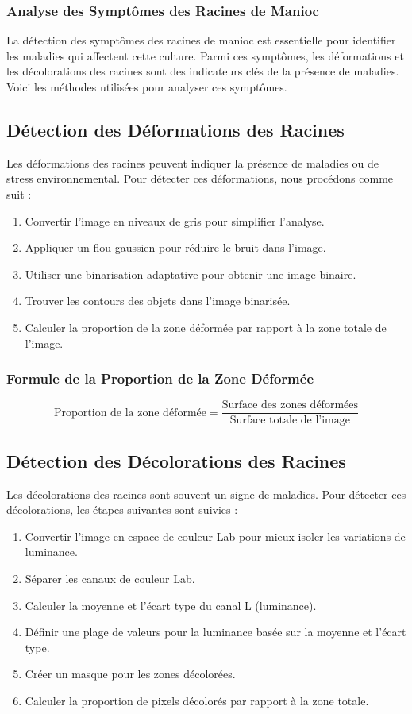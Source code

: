 \subsubsection{Analyse des Symptômes des Racines de Manioc}

La détection des symptômes des racines de manioc est essentielle pour identifier les maladies qui affectent cette culture. Parmi ces symptômes, les déformations et les décolorations des racines sont des indicateurs clés de la présence de maladies. Voici les méthodes utilisées pour analyser ces symptômes.

\subsection*{Détection des Déformations des Racines}

Les déformations des racines peuvent indiquer la présence de maladies ou de stress environnemental. Pour détecter ces déformations, nous procédons comme suit :
\begin{enumerate}
	\item Convertir l'image en niveaux de gris pour simplifier l'analyse.
	\item Appliquer un flou gaussien pour réduire le bruit dans l'image.
	\item Utiliser une binarisation adaptative pour obtenir une image binaire.
	\item Trouver les contours des objets dans l'image binarisée.
	\item Calculer la proportion de la zone déformée par rapport à la zone totale de l'image.
\end{enumerate}

\subsubsection*{Formule de la Proportion de la Zone Déformée}
\[
\text{Proportion de la zone déformée} = \frac{\text{Surface des zones déformées}}{\text{Surface totale de l'image}}
\]

\subsection*{Détection des Décolorations des Racines}

Les décolorations des racines sont souvent un signe de maladies. Pour détecter ces décolorations, les étapes suivantes sont suivies :
\begin{enumerate}
	\item Convertir l'image en espace de couleur Lab pour mieux isoler les variations de luminance.
	\item Séparer les canaux de couleur Lab.
	\item Calculer la moyenne et l'écart type du canal L (luminance).
	\item Définir une plage de valeurs pour la luminance basée sur la moyenne et l'écart type.
	\item Créer un masque pour les zones décolorées.
	\item Calculer la proportion de pixels décolorés par rapport à la zone totale.
\end{enumerate}

